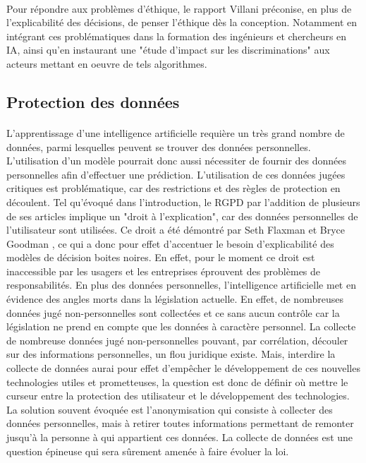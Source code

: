 \paragraph{}Pour répondre aux problèmes d'éthique, le rapport Villani préconise, en plus de l'explicabilité des décisions, de penser l'éthique dès la conception. Notamment en intégrant ces problématiques dans la formation des ingénieurs et chercheurs en IA, ainsi qu'en instaurant une "étude d’impact sur les discriminations" aux acteurs mettant en oeuvre de tels algorithmes.

\subsection{Protection des données}
\paragraph{}L'apprentissage d'une intelligence artificielle requière un très grand nombre de données, parmi lesquelles peuvent se trouver des données personnelles. L'utilisation d'un modèle pourrait donc aussi nécessiter de fournir des données personnelles afin d'effectuer une prédiction. L'utilisation de ces données jugées critiques est problématique, car des restrictions et des règles de protection en découlent. Tel qu'évoqué dans l'introduction, le RGPD par l'addition de plusieurs de ses articles implique un "droit à l'explication", car des données personnelles de l'utilisateur sont utilisées. Ce droit a été démontré par Seth Flaxman et Bryce Goodman \cite{RGPDexplanRight}, ce qui a donc pour effet d'accentuer le besoin d'explicabilité des modèles de décision boites noires. En effet, pour le moment ce droit est inaccessible par les usagers et les entreprises éprouvent des problèmes de responsabilités. En plus des données personnelles, l'intelligence artificielle met en évidence des angles morts dans la législation actuelle. En effet, de nombreuses données jugé non-personnelles sont collectées et ce sans aucun contrôle car la législation ne prend en compte que les données à caractère personnel. La collecte de nombreuse données jugé non-personnelles pouvant, par corrélation, découler sur des informations personnelles, un flou juridique existe. Mais, interdire la collecte de données aurai pour effet d'empêcher le développement de ces nouvelles technologies utiles et prometteuses, la question est donc de définir où mettre le curseur entre la protection des utilisateur et le développement des technologies. La solution souvent évoquée est l'anonymisation qui consiste à collecter des données personnelles, mais à retirer toutes informations permettant de remonter jusqu'à la personne à qui appartient ces données. La collecte de données est une question épineuse qui sera sûrement amenée à faire évoluer la loi.

